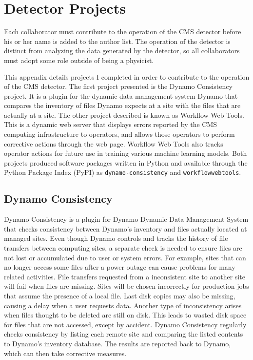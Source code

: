 \chapter{Detector Projects} \label{app:project}

Each collaborator must contribute to the operation of the CMS detector before his or her name is added to the author list.
The operation of the detector is distinct from analyzing the data generated by the detector, so all collaborators must adopt some role outside of being a physicist.

This appendix details projects I completed in order to contribute to the operation of the CMS detector.
The first project presented is the Dynamo Consistency project.
It is a plugin for the dynamic data management system Dynamo \cite{iiyama2020dynamo} that compares the inventory of files Dynamo expects at a site with the files that are actually at a site.
The other project described is known as Workflow Web Tools.
This is a dynamic web server that displays errors reported by the CMS computing infrastructure to operators, and allows those operators to perform corrective actions through the web page.
Workflow Web Tools also tracks operator actions for future use in training various machine learning models.
Both projects produced software packages written in Python \cite{van1995python, 10.5555/1593511} and available through the Python Package Index (PyPI) as \texttt{dynamo-consistency} and \texttt{workflowwebtools}.


\section{Dynamo Consistency}

Dynamo Consistency is a plugin for Dynamo Dynamic Data Management System that checks
consistency between Dynamo’s inventory and files actually located at managed sites.
Even though Dynamo controls and tracks the history of file transfers between computing sites,
a separate check is needed to ensure files are not lost or accumulated due to user or system errors.
For example, sites that can no longer access some files after a power outage
can cause problems for many related activities.
File transfers requested from a inconsistent site to another site will fail when files are missing.
Sites will be chosen incorrectly for production jobs that assume the presence of a local file.
Last disk copies may also be missing, causing a delay when a user requests data.
Another type of inconsistency arises when files thought to be deleted are still on disk.
This leads to wasted disk space for files that are not accessed, except by accident.
Dynamo Consistency regularly checks consistency by listing each remote site and
comparing the listed contents to Dynamo’s inventory database.
The results are reported back to Dynamo, which can then take corrective measures.


